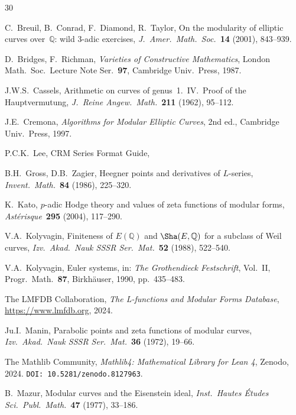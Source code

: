 \documentclass[11pt]{article}
\theoremstyle{plain}
\theoremstyle{definition}
\theoremstyle{remark}
\newcommand{\Q}{\mathbb{Q}}
\begin{document}
\begin{thebibliography}{30}

C.~Breuil, B.~Conrad, F.~Diamond, R.~Taylor,
On the modularity of elliptic curves over~$\Q$: wild 3-adic exercises,
\emph{J.\ Amer.\ Math.\ Soc.}\ \textbf{14} (2001), 843--939.

D.~Bridges, F.~Richman,
\emph{Varieties of Constructive Mathematics},
London Math.\ Soc.\ Lecture Note Ser.\ \textbf{97}, Cambridge Univ.\ Press, 1987.

J.W.S.~Cassels,
Arithmetic on curves of genus~1.\ IV.\ Proof of the Hauptvermutung,
\emph{J.\ Reine Angew.\ Math.}\ \textbf{211} (1962), 95--112.

J.E.~Cremona,
\emph{Algorithms for Modular Elliptic Curves}, 2nd ed.,
Cambridge Univ.\ Press, 1997.

P.C.K.~Lee,
CRM Series Format Guide,

B.H.~Gross, D.B.~Zagier,
Heegner points and derivatives of $L$-series,
\emph{Invent.\ Math.}\ \textbf{84} (1986), 225--320.

K.~Kato,
$p$-adic Hodge theory and values of zeta functions of modular forms,
\emph{Ast\'erisque}\ \textbf{295} (2004), 117--290.

V.A.~Kolyvagin,
Finiteness of $E(\Q)$ and $\Sha(E,\Q)$ for a subclass of Weil curves,
\emph{Izv.\ Akad.\ Nauk SSSR Ser.\ Mat.}\ \textbf{52} (1988), 522--540.

V.A.~Kolyvagin,
Euler systems,
in: \emph{The Grothendieck Festschrift}, Vol.~II, Progr.\ Math.\ \textbf{87}, Birkh\"auser, 1990, pp.~435--483.

The LMFDB Collaboration,
\emph{The L-functions and Modular Forms Database},
\url{https://www.lmfdb.org}, 2024.

Ju.I.~Manin,
Parabolic points and zeta functions of modular curves,
\emph{Izv.\ Akad.\ Nauk SSSR Ser.\ Mat.}\ \textbf{36} (1972), 19--66.

The Mathlib Community,
\emph{Mathlib4: Mathematical Library for Lean 4},
Zenodo, 2024. \texttt{DOI: 10.5281/zenodo.8127963}.

B.~Mazur,
Modular curves and the Eisenstein ideal,
\emph{Inst.\ Hautes \'Etudes Sci.\ Publ.\ Math.}\ \textbf{47} (1977), 33--186.


\end{thebibliography}
\end{document}
